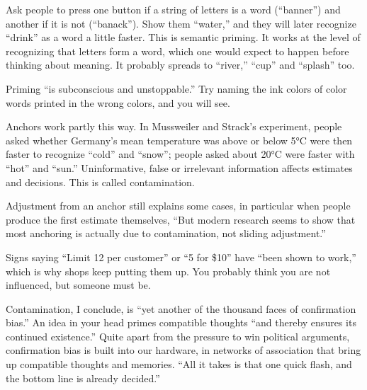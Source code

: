
Ask people to press one button if a string of letters is a word (``banner'') and another if it is not (``banack''). Show them ``water,'' and they will later recognize ``drink'' as a word a little faster. This is semantic priming.  It works at the level of recognizing that letters form a word, which one would expect to happen before thinking about meaning. It probably spreads to ``river,'' ``cup'' and ``splash'' too.

Priming ``is subconscious and unstoppable.''  Try naming the ink colors of color words printed in the wrong colors, and you will see.

Anchors work partly this way. In Mussweiler and Strack's experiment, people asked whether Germany's mean temperature was above or below 5°C were then faster to recognize ``cold'' and ``snow''; people asked about 20°C were faster with ``hot'' and ``sun.'' Uninformative, false or irrelevant information affects estimates and decisions. This is called contamination.

Adjustment from an anchor still explains some cases, in particular when people produce the first estimate themselves, ``But modern research seems to show that most anchoring is actually due to contamination, not sliding adjustment.'' 

Signs saying ``Limit 12 per customer'' or ``5 for \$10'' have ``been shown to work,'' which is why shops keep putting them up. You probably think you are not influenced, but someone must be.

Contamination, I conclude, is ``yet another of the thousand faces of confirmation bias.'' An idea in your head primes compatible thoughts ``and thereby ensures its continued existence.'' Quite apart from the pressure to win political arguments, confirmation bias is built into our hardware, in networks of association that bring up compatible thoughts and memories. ``All it takes is that one quick flash, and the bottom line is already decided.'' 

